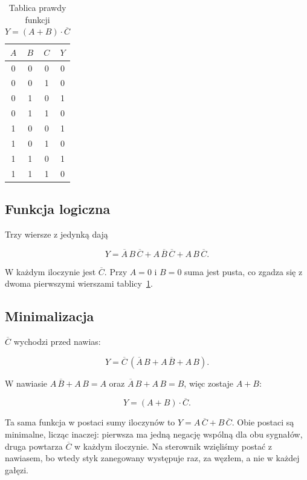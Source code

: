 \begin{table}[H]
    \centering
    \caption{Tablica prawdy funkcji $Y = (A + B) \cdot \overline{C}$}
    \label{tab:z2-prawda}
    \begin{tabular}{|c|c|c|c|}
        \hline
        $A$ & $B$ & $C$ & $Y$ \\
        \hline
        0 & 0 & 0 & 0 \\
        \hline
        0 & 0 & 1 & 0 \\
        \hline
        0 & 1 & 0 & 1 \\
        \hline
        0 & 1 & 1 & 0 \\
        \hline
        1 & 0 & 0 & 1 \\
        \hline
        1 & 0 & 1 & 0 \\
        \hline
        1 & 1 & 0 & 1 \\
        \hline
        1 & 1 & 1 & 0 \\
        \hline
    \end{tabular}
\end{table}

\subsection{Funkcja logiczna}

Trzy wiersze z jedynką dają

\[
Y = \overline{A}\,B\,\overline{C} + A\,\overline{B}\,\overline{C} + A\,B\,\overline{C}.
\]

W każdym iloczynie jest $\overline{C}$. Przy $A = 0$ i $B = 0$ suma jest pusta, co zgadza się z dwoma pierwszymi wierszami tablicy~\ref{tab:z2-prawda}.

\subsection{Minimalizacja}

$\overline{C}$ wychodzi przed nawias:

\[
Y = \overline{C}\,(\overline{A}\,B + A\,\overline{B} + A\,B).
\]

W nawiasie $A\,\overline{B} + A\,B = A$ oraz $\overline{A}\,B + A\,B = B$, więc zostaje $A + B$:

\[
Y = (A + B) \cdot \overline{C}.
\]

Ta sama funkcja w postaci sumy iloczynów to $Y = A\,\overline{C} + B\,\overline{C}$. Obie postaci są minimalne, licząc inaczej: pierwsza ma jedną negację wspólną dla obu sygnałów, druga powtarza $\overline{C}$ w każdym iloczynie. Na sterownik wzięliśmy postać z nawiasem, bo wtedy styk zanegowany występuje raz, za węzłem, a nie w każdej gałęzi.

